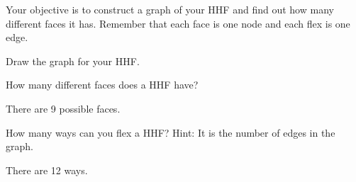 \documentclass[a4paper,12pt]{article}
\begin{document}
Your objective is to construct a graph of your HHF and find out how many
different faces it has. Remember that each face is one node and each flex is one
edge.

\begin{question}[skip-below=20\baselineskip]
Draw the graph for your HHF.
\end{question}
\begin{solution}

\end{solution}

\begin{question}[skip-below=3\baselineskip]
How many different faces does a HHF have?
\end{question}
\begin{solution}
There are 9 possible faces.  
\end{solution}

\begin{question}[skip-below=3\baselineskip]
How many ways can you flex a HHF? Hint: It is the number of edges in the graph.  
\end{question}
\begin{solution}
There are 12 ways.
\end{solution}
\end{document}
